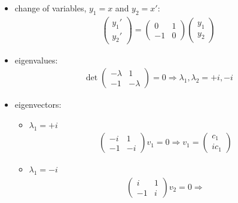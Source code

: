 \documentclass[12pt, letterpaper]{scrartcl}
\begin{document}
\begin{itemize}
    \item change of variables, $y_1=x$ and $y_2=x'$:
    \begin{align*}
        \left(\begin{array}{c}
        y_1' \\
        y_2' 
        \end{array}\right)=
        \left(\begin{array}{cc}
        0 & 1 \\
        -1 & 0 
        \end{array}\right)
        \left(\begin{array}{c}
        y_1 \\
        y_2 
        \end{array}\right)
    \end{align*}
    \item eigenvalues:
    \begin{align*}
        \det 
        \left(\begin{array}{cc}
        -\lambda & 1 \\
        -1 & -\lambda 
        \end{array}\right)=0
        \Longrightarrow
        \lambda_{1},\lambda_{2}=+i, -i
    \end{align*}
    \item eigenvectors:
    \begin{itemize}
        \item $\lambda_{1}=+i$
        \begin{align*}
            \left(\begin{array}{cc}
            -i & 1 \\
            -1 & -i 
            \end{array}\right)
            v_1=0
            \Longrightarrow
            v_1=\left(\begin{array}{c}
            c_1 \\
            ic_1 
            \end{array}\right)
        \end{align*}
        \item $\lambda_{1}=-i$
        \begin{align*}
            \left(\begin{array}{cc}
            i & 1 \\
            -1 & i 
            \end{array}\right)
            v_2=0
            \Longrightarrow

\end{align*}
\end{itemize}
\end{itemize}
\end{document}
